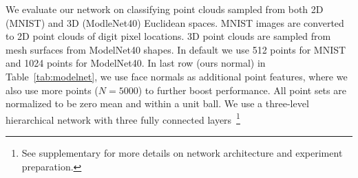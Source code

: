 We evaluate our network on classifying point clouds sampled from both 2D (MNIST) and 3D (ModleNet40) Euclidean spaces. MNIST images are converted to 2D point clouds of digit pixel locations. 3D point clouds are sampled from mesh surfaces from ModelNet40 shapes. In default we use 512 points for MNIST and 1024 points for ModelNet40. In last row (ours normal) in Table~\ref{tab:modelnet}, we use face normals as additional point features, where we also use more points ($N=5000$) to further boost performance. All point sets are normalized to be zero mean and within a unit ball. We use a three-level hierarchical network with three fully connected layers~\footnote{See supplementary for more details on network architecture and experiment preparation.}






